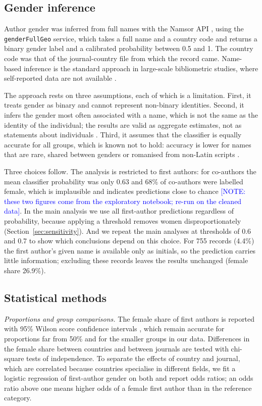 \documentclass[preprint,12pt,number]{elsarticle}
\newcommand{\note}[1]{\textcolor{blue}{[NOTE: #1]}}
\begin{document}
\subsection{Gender inference}\label{sec:genderinference}

Author gender was inferred from full names with the Namsor API \citep{Namsor2024}, using the \texttt{genderFullGeo} service, which takes a full name and a country code and returns a binary gender label and a calibrated probability between 0.5 and 1. The country code was that of the journal-country file from which the record came. Name-based inference is the standard approach in large-scale bibliometric studies, where self-reported data are not available \citep{Lariviere2013,West2013}.

The approach rests on three assumptions, each of which is a limitation. First, it treats gender as binary and cannot represent non-binary identities. Second, it infers the gender most often associated with a name, which is not the same as the identity of the individual; the results are valid as aggregate estimates, not as statements about individuals \citep{Lockhart2023}. Third, it assumes that the classifier is equally accurate for all groups, which is known not to hold: accuracy is lower for names that are rare, shared between genders or romanised from non-Latin scripts \citep{Santamaria2018,Lockhart2023}.

Three choices follow. The analysis is restricted to first authors: for co-authors the mean classifier probability was only 0.63 and 68\% of co-authors were labelled female, which is implausible and indicates predictions close to chance \note{these two figures come from the exploratory notebook; re-run on the cleaned data}. In the main analysis we use all first-author predictions regardless of probability, because applying a threshold removes women disproportionately (Section~\ref{sec:sensitivity}). And we repeat the main analyses at thresholds of 0.6 and 0.7 to show which conclusions depend on this choice. For 755 records (4.4\%) the first author's given name is available only as initials, so the prediction carries little information; excluding these records leaves the results unchanged (female share 26.9\%).

\subsection{Statistical methods}

\textit{Proportions and group comparisons.} The female share of first authors is reported with 95\% Wilson score confidence intervals \citep{Wilson1927}, which remain accurate for proportions far from 50\% and for the smaller groups in our data. Differences in the female share between countries and between journals are tested with chi-square tests of independence. To separate the effects of country and journal, which are correlated because countries specialise in different fields, we fit a logistic regression of first-author gender on both and report odds ratios; an odds ratio above one means higher odds of a female first author than in the reference category.
\end{document}
